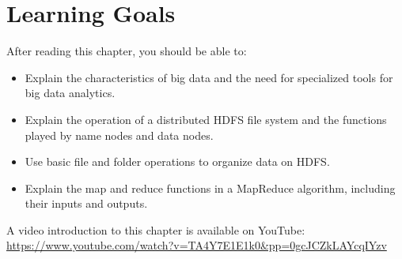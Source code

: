 %
%
\section*{Learning Goals}

After reading this chapter, you should be able to:
\begin{itemize}
    \item Explain the characteristics of big data and the need for specialized tools for big data analytics.
    \item Explain the operation of a distributed HDFS file system and the functions played by name nodes and data nodes. 
    \item Use basic file and folder operations to organize data on HDFS.
    \item Explain the map and reduce functions in a MapReduce algorithm, including their inputs and outputs.
\end{itemize}

\begin{advanced}
\begin{videobox}
A video introduction to this chapter is available on YouTube:\\

\url{https://www.youtube.com/watch?v=TA4Y7E1E1k0&pp=0gcJCZkLAYcqIYzv}
\end{videobox}
\end{advanced}

